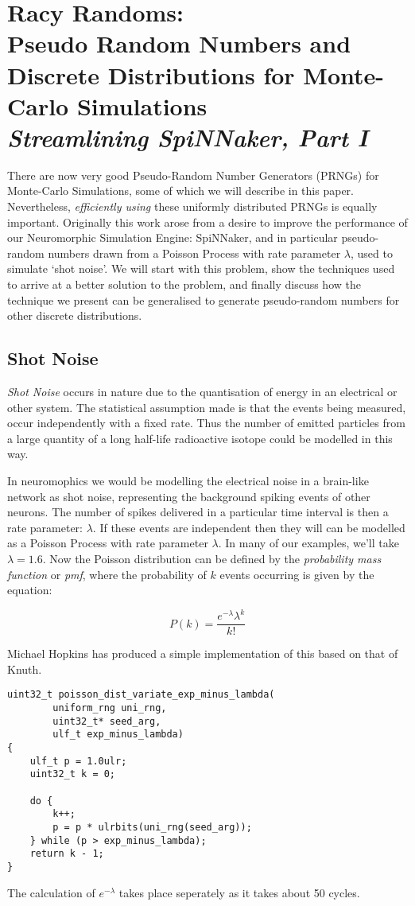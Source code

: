 \chapter[Racy Randoms]{Racy Randoms:\\
Pseudo Random Numbers
  and Discrete Distributions for Monte-Carlo Simulations\\
{\it Streamlining SpiNNaker, Part I}}

There are now very good Pseudo-Random Number Generators (PRNGs) for
Monte-Carlo Simulations, some of which we will describe in this
paper. Nevertheless, {\it efficiently using} these uniformly
distributed PRNGs is equally important. Originally this work arose
from a desire to improve the performance of our Neuromorphic
Simulation Engine: SpiNNaker, and in particular pseudo-random numbers
drawn from a Poisson Process with rate parameter $\lambda$, used to
simulate `shot noise'. We will start with this problem, show the
techniques used to arrive at a better solution to the problem, and
finally discuss how the technique we present can be generalised to
generate pseudo-random numbers for other discrete distributions.

\section{Shot Noise}

{\it Shot Noise} occurs in nature due to the quantisation of  energy
in an electrical or other system. The statistical assumption made is that
the events being measured, occur independently with a fixed rate. Thus
the number of emitted particles from a large quantity of a long
half-life radioactive isotope could be modelled in this way.

In neuromophics we would be modelling the electrical noise in a
brain-like network as shot noise, representing the background spiking
events of other neurons. The number of spikes delivered in a
particular time interval is then a rate parameter: $\lambda$. If these
events are independent then they will can be modelled as a Poisson
Process with rate parameter $\lambda$. In many of our examples, we'll
take $\lambda = 1.6$.  Now the Poisson distribution can be defined by
the {\em probability mass function} or {\em pmf}, where the
probability of $k$ events occurring is given by the equation:

\[ P(k)=\frac{e^{-\lambda} {\lambda}^k}{k!}\]

Michael Hopkins has produced a simple implementation of this based on
that of Knuth.
\begin{verbatim}
uint32_t poisson_dist_variate_exp_minus_lambda(
        uniform_rng uni_rng,
        uint32_t* seed_arg,
        ulf_t exp_minus_lambda)
{
    ulf_t p = 1.0ulr;
    uint32_t k = 0;

    do {
        k++;
        p = p * ulrbits(uni_rng(seed_arg));
    } while (p > exp_minus_lambda);
    return k - 1;
}
\end{verbatim}
The calculation of $e^{-\lambda}$ takes place seperately as it takes
about 50 cycles.

